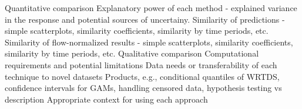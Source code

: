 \documentclass[letterpaper,12pt]{article}\usepackage[]{graphicx}\usepackage[]{color}
\begin{document}
\begin{outline}
\2 Quantitative comparison
\3 Explanatory power of each method - explained variance in the response and potential sources of uncertainy.
\3 Similarity of predictions - simple scatterplots, similarity coefficients, similarity by time periods, etc.
\3 Similarity of flow-normalized results - simple scatterplots, similarity coefficients, similarity by time periods, etc.
\2 Qualitative comparison
\3 Computational requirements and potential limitations
\3 Data needs or transferability of each technique to novel datasets
\3 Products, e.g., conditional quantiles of \ac{WRTDS}, confidence intervals for \acp{GAM}, handling censored data, hypothesis testing vs description
\3 Appropriate context for using each approach
\end{outline}
\end{document}
